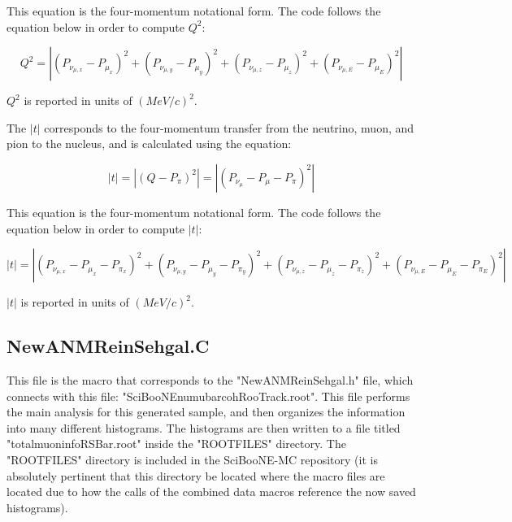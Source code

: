 \documentclass[11pt]{article}
\begin{document}
\noindent
This equation is the four-momentum notational form. The code follows the equation below in order to compute $Q^2$:

\begin{equation}
Q^2 = |(P_{\nu_{\mu,x}} - P_{\mu_x})^2 + (P_{\nu_{\mu,y}} - P_{\mu_y})^2 + (P_{\nu_{\mu,z}} - P_{\mu_z})^2 + (P_{\nu_{\mu,E}} - P_{\mu_E})^2|
\end{equation}

\noindent
$Q^2$ is reported in units of $(MeV/c)^2$.

The $|t|$ corresponds to the four-momentum transfer from the neutrino, muon, and pion to the nucleus, and is calculated using the equation:

\begin{equation}
|t| = |(Q - P_\pi)^2| = |(P_{\nu_\mu} - P_\mu - P_\pi)^2|
\end{equation}

\noindent
This equation is the four-momentum notational form. The code follows the equation below in order to compute $|t|$:

\begin{equation}
|t| = |(P_{\nu_{\mu,x}} - P_{\mu_x} - P_{\pi_x})^2 + (P_{\nu_{\mu,y}} - P_{\mu_y} - P_{\pi_y})^2 + (P_{\nu_{\mu,z}} - P_{\mu_z} - P_{\pi_z})^2 + (P_{\nu_{\mu,E}} - P_{\mu_E} - P_{\pi_E})^2|
\end{equation}

\noindent
$|t|$ is reported in units of $(MeV/c)^2$.

\subsection{NewANMReinSehgal.C}
This file is the macro that corresponds to the "NewANMReinSehgal.h" file, which connects with this file: "SciBooNE\textunderscore numubar\textunderscore coh\textunderscore RooTrack.root". This file performs the main analysis for this generated sample, and then organizes the information into many different histograms. The histograms are then written to a file titled "totalmuoninfoRSBar.root" inside the "ROOTFILES" directory. The "ROOTFILES" directory is included in the SciBooNE-MC repository (it is absolutely pertinent that this directory be located where the macro files are located due to how the calls of the combined data macros reference the now saved histograms).
\end{document}
